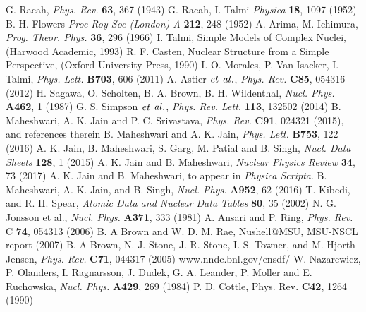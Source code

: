 \documentclass[twocolumn,showpacs,showkeys,preprintnumbers,amsmath,amssymb]{revtex4}
\begin{document}
\newpage %
\begin{thebibliography}{50}
G. Racah, \textit{Phys. Rev.} \textbf{63}, 367 (1943)
 G. Racah, I. Talmi \textit{Physica} \textbf{18}, 1097 (1952)
 B. H. Flowers \textit{Proc Roy Soc (London) A} \textbf{212}, 248 (1952)
A. Arima, M. Ichimura, \textit{Prog. Theor. Phys.} \textbf{36}, 296 (1966)
I. Talmi, Simple Models of Complex Nuclei, (Harwood Academic, 1993)
R. F. Casten, Nuclear Structure from a Simple Perspective, (Oxford University Press, 1990)
I. O. Morales, P. Van Isacker, I. Talmi, \textit{Phys. Lett.} \textbf{B703}, 606 (2011)
A. Astier $\it{et}$ $\it{al.}$, \textit{Phys. Rev.} \textbf{C85}, 054316 (2012)
H. Sagawa, O. Scholten, B. A. Brown, B. H. Wildenthal, \textit{Nucl. Phys.} \textbf{A462}, 1 (1987)
G. S. Simpson $\it{et}$ $\it{al.}$, \textit{Phys. Rev. Lett.} \textbf{113}, 132502 (2014)
B. Maheshwari, A. K. Jain and P. C. Srivastava, \textit{Phys. Rev.} \textbf{C91}, 024321 (2015), and references therein
B. Maheshwari and A. K. Jain, \textit{Phys. Lett.} \textbf{B753}, 122 (2016)
A. K. Jain, B. Maheshwari, S. Garg, M. Patial and B. Singh, \textit{Nucl. Data Sheets} \textbf{128}, 1 (2015)
A. K. Jain and B. Maheshwari, \textit{Nuclear Physics Review} \textbf{34}, 73 (2017)
A. K. Jain and B. Maheshwari, to appear in \textit{Physica Scripta}.
B. Maheshwari, A. K. Jain, and B. Singh, \textit{Nucl. Phys.} \textbf{A952}, 62 (2016)
T. Kibedi, and R. H. Spear, \textit{Atomic Data and Nuclear Data Tables} \textbf{80}, 35 (2002)
N. G. Jonsson et al., \textit{Nucl. Phys.} \textbf{A371}, 333 (1981)
A. Ansari and P. Ring, \textit{Phys. Rev.} C \textbf{74}, 054313 (2006)
B. A Brown and W. D. M. Rae, Nushell@MSU, MSU-NSCL report (2007)
B. A Brown, N. J. Stone, J. R. Stone, I. S. Towner, and M. Hjorth-Jensen, \textit{Phys. Rev.} \textbf{C71}, 044317 (2005)
www.nndc.bnl.gov/ensdf/
W. Nazarewicz, P. Olanders, I. Ragnarsson, J. Dudek, G. A. Leander, P. Moller and E. Ruchowska, \textit{Nucl. Phys.} \textbf{A429}, 269 (1984)
P. D. Cottle, Phys. Rev. \textbf{C42}, 1264 (1990)

\end{thebibliography}  
\end{document}
